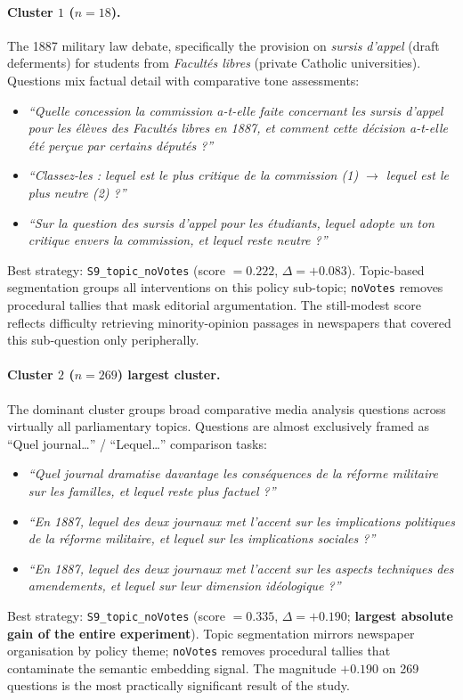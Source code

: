 \paragraph{Cluster $1$ ($n=18$).}
The 1887 military law debate, specifically the provision on \emph{sursis d'appel}
(draft deferments) for students from \emph{Facult\'{e}s libres} (private Catholic
universities).
Questions mix factual detail with comparative tone assessments:
\begin{itemize}
  \item \textit{``Quelle concession la commission a-t-elle faite concernant les
    sursis d'appel pour les \'{e}l\`{e}ves des Facult\'{e}s libres en 1887, et
    comment cette d\'{e}cision a-t-elle \'{e}t\'{e} per\c{c}ue par certains
    d\'{e}put\'{e}s ?''}
  \item \textit{``Classez-les : lequel est le plus critique de la commission
    (1) $\to$ lequel est le plus neutre (2) ?''}
  \item \textit{``Sur la question des sursis d'appel pour les \'{e}tudiants,
    lequel adopte un ton critique envers la commission, et lequel reste neutre ?''}
\end{itemize}
Best strategy: \texttt{S9\_topic\_noVotes} (score $= 0.222$, $\Delta = +0.083$).
Topic-based segmentation groups all interventions on this policy sub-topic;
\texttt{noVotes} removes procedural tallies that mask editorial argumentation.
The still-modest score reflects difficulty retrieving minority-opinion passages in
newspapers that covered this sub-question only peripherally.

\paragraph{Cluster $2$ ($n=269$) largest cluster.}
The dominant cluster groups broad comparative media analysis questions across
virtually all parliamentary topics.
Questions are almost exclusively framed as ``Quel journal\ldots'' /
``Lequel\ldots'' comparison tasks:
\begin{itemize}
  \item \textit{``Quel journal dramatise davantage les cons\'{e}quences de la
    r\'{e}forme militaire sur les familles, et lequel reste plus factuel ?''}
  \item \textit{``En 1887, lequel des deux journaux met l'accent sur les
    implications politiques de la r\'{e}forme militaire, et lequel sur les
    implications sociales ?''}
  \item \textit{``En 1887, lequel des deux journaux met l'accent sur les aspects
    techniques des amendements, et lequel sur leur dimension id\'{e}ologique ?''}
\end{itemize}
Best strategy: \texttt{S9\_topic\_noVotes} (score $= 0.335$, $\Delta = +0.190$;
\textbf{largest absolute gain of the entire experiment}).
Topic segmentation mirrors newspaper organisation by policy theme; \texttt{noVotes}
removes procedural tallies that contaminate the semantic embedding signal.
The magnitude $+0.190$ on 269 questions is the most practically
significant result of the study.

